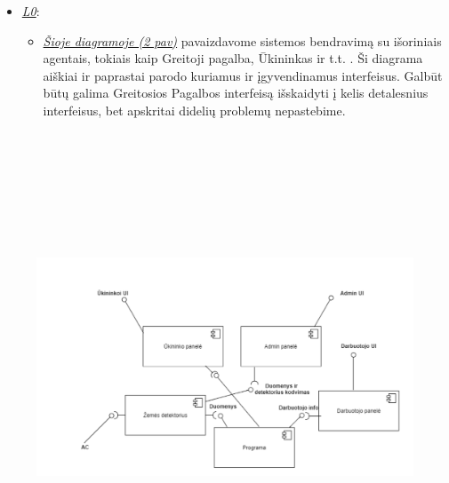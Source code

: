 \documentclass[oneside]{VUMIFPSkursinis}
\begin{document}
	\begin{itemize}
		
		\item \hyperref[fig:l0]{\textit{L0}}:
		\begin{itemize}
			\item  \hyperref[fig:l0]{\textit{Šioje diagramoje (2 pav)}} pavaizdavome sistemos bendravimą su išoriniais agentais, tokiais kaip Greitoji pagalba, Ūkininkas ir t.t. . Ši diagrama aiškiai ir paprastai parodo kuriamus ir įgyvendinamus interfeisus. Galbūt būtų galima Greitosios Pagalbos interfeisą išskaidyti į kelis detalesnius interfeisus, bet apskritai didelių problemų nepastebime.

		\end{itemize}

	\end{itemize}
\begin{figure}[H]	
\centering	
\includegraphics[width=14cm,height=14cm,keepaspectratio]{l1.png}	
\caption{}
\label{fig:l1}
\end{figure}
\end{document}
